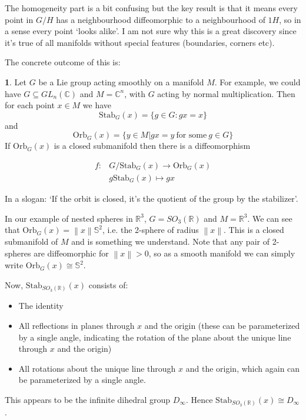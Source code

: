 \documentclass[oneside,english]{amsbook}
\numberwithin{section}{chapter}
\theoremstyle{plain}
\theoremstyle{definition}
\newtheorem{defn}[thm]{\protect\definitionname}
\newcommand{\norm}[1]{\left\lVert#1\right\rVert}
\providecommand{\definitionname}{Definition}
\begin{document}
The homogeneity part is a bit confusing but the key result is that it means every point in $G/H$ has a neighbourhood diffeomorphic to a neighbourhood of $1H$, so in a sense every point `looks alike'. I am not sure why this is a great discovery since it's true of all manifolds without special features (boundaries, corners etc).

The concrete outcome of this is:

\begin{defn}
	Let $G$ be a Lie group acting smoothly on a manifold $M$. For example, we could have $G\subseteq GL_n(\mathbb{C})$ and $M = \mathbb{C}^n$, with $G$ acting by normal multiplication. Then for each point $x\in M$ we have
	\[
		\text{Stab}_G(x) = \{g\in G : gx = x\}
	\]
	and
	\[
		\text{Orb}_G(x) = \{y\in M | gx = y \ \text{for some}\ g\in G\}
	\]
	If $\text{Orb}_G(x)$ is a closed submanifold then there is a diffeomorphism
	
		\begin{align}
			f: & G/\text{Stab}_G(x)\to \text{Orb}_G(x) \\
			   & g\text{Stab}_G(x)\mapsto gx
		\end{align}
	
	In a slogan: `If the orbit is closed, it's the quotient of the group by the stabilizer'.
\end{defn}

In our example of nested spheres in $\mathbb{R}^3$, $G = SO_3(\mathbb{R})$ and $M = \mathbb{R}^3$. We can see that $\text{Orb}_G(x) = \norm{x}\mathbb{S}^2$, i.e. the 2-sphere of radius $\norm{x}$. This is a closed submanifold of $M$ and is something we understand. Note that any pair of 2-spheres are diffeomorphic for $\norm{x} > 0$, so as a smooth manifold we can simply write $\text{Orb}_G(x) \cong \mathbb{S}^2$.

Now, $\text{Stab}_{SO_3(\mathbb{R})}(x)$ consists of:
\begin{itemize}
	\item The identity
	\item All reflections in planes through $x$ and the origin (these can be parameterized by a single angle, indicating the rotation of the plane about the unique line through $x$ and the origin)
	\item All rotations about the unique line through $x$ and the origin, which again can be parameterized by a single angle.
\end{itemize}
This appears to be the infinite dihedral group $D_\infty$. Hence $\text{Stab}_{SO_3(\mathbb{R})}(x)\cong D_\infty$. 
\end{document}
